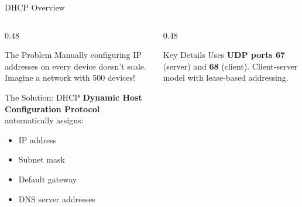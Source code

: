 \documentclass[aspectratio=169, 11pt]{beamer}
\newcommand{\iconpc}[1][0.6cm]{\resizebox{#1}{!}{\faDesktop}}
\newcommand{\keyterm}[1]{\textbf{\textcolor{rctcblue}{#1}}}
\begin{document}
\begin{frame}{DHCP Overview}
    \begin{columns}[T]
        \begin{column}{0.48\textwidth}
            \begin{block}{The Problem}
                \small
                Manually configuring IP addresses on every device doesn't scale. Imagine a network with 500 devices!
            \end{block}
            
            \vspace{0.2em}
            \begin{block}{The Solution: DHCP}
                \small
                \keyterm{Dynamic Host Configuration Protocol} automatically assigns:
                \begin{itemize}\setlength{\itemsep}{1pt}
                    \item IP address
                    \item Subnet mask
                    \item Default gateway
                    \item DNS server addresses
                \end{itemize}
            \end{block}
           
        \end{column}
        \begin{column}{0.48\textwidth}
             \begin{alertblock}{Key Details}
                \small
                Uses \textbf{UDP ports 67} (server) and \textbf{68} (client). Client-server model with lease-based addressing.
            \end{alertblock}

            \begin{center}
\end{center}
\end{column}
\end{columns}
\end{frame}
\end{document}
